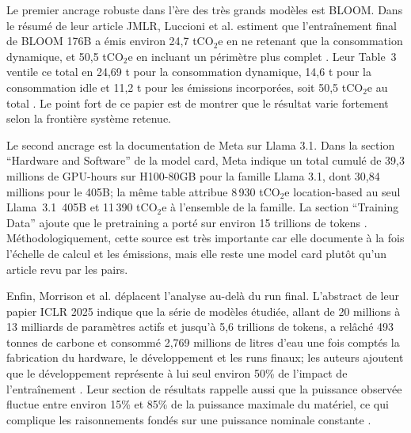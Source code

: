\documentclass[11pt,a4paper]{article}
\begin{document}
Le premier ancrage robuste dans l'ère des très grands modèles est BLOOM. Dans le résumé de leur article JMLR, Luccioni et al. estiment que l'entraînement final de BLOOM 176B a émis environ 24,7 tCO$_2$e en ne retenant que la consommation dynamique, et 50,5 tCO$_2$e en incluant un périmètre plus complet \cite{luccioni2023}. Leur Table~3 ventile ce total en 24,69 t pour la consommation dynamique, 14,6 t pour la consommation idle et 11,2 t pour les émissions incorporées, soit 50,5 tCO$_2$e au total \cite{luccioni2023}. Le point fort de ce papier est de montrer que le résultat varie fortement selon la frontière système retenue.

Le second ancrage est la documentation de Meta sur Llama 3.1. Dans la section ``Hardware and Software'' de la model card, Meta indique un total cumulé de 39,3 millions de GPU-hours sur H100-80GB pour la famille Llama 3.1, dont 30,84 millions pour le 405B; la même table attribue 8\,930 tCO$_2$e location-based au seul Llama~3.1~405B et 11\,390 tCO$_2$e à l'ensemble de la famille. La section ``Training Data'' ajoute que le pretraining a porté sur environ 15 trillions de tokens \cite{meta2024llama}. Méthodologiquement, cette source est très importante car elle documente à la fois l'échelle de calcul et les émissions, mais elle reste une model card plutôt qu'un article revu par les pairs.

Enfin, Morrison et al. déplacent l'analyse au-delà du run final. L'abstract de leur papier ICLR 2025 indique que la série de modèles étudiée, allant de 20 millions à 13 milliards de paramètres actifs et jusqu'à 5,6 trillions de tokens, a relâché 493 tonnes de carbone et consommé 2,769 millions de litres d'eau une fois comptés la fabrication du hardware, le développement et les runs finaux; les auteurs ajoutent que le développement représente à lui seul environ 50\% de l'impact de l'entraînement \cite{morrison2025}. Leur section de résultats rappelle aussi que la puissance observée fluctue entre environ 15\% et 85\% de la puissance maximale du matériel, ce qui complique les raisonnements fondés sur une puissance nominale constante \cite{morrison2025}.
\end{document}
